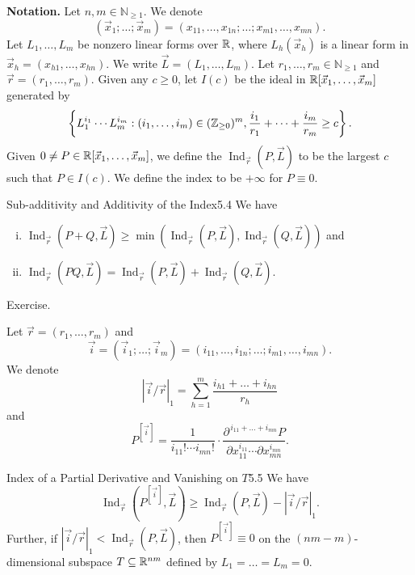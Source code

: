 \documentclass{Vorlesungstemplate_English} %
\renewcommand{\N}{\mathbb{N}_{\geq 1}}
\begin{document}
\fi
\color{orange} \renewcommand{\pfcolor}{orange}
\noindent\textbf{Notation.} Let $n, m \in \N$. We denote
\[ (\vec x_1; \dots; \vec x_m) = (x_{11}, \dots, x_{1n}; \dots; x_{m1}, \dots, x_{mn}).\]
Let $L_1, \dots, L_m$ be nonzero linear forms over $\mathbb{R}$, where $L_h(\vec x_h)$ is a linear form in $\vec x_h = (x_{h1}, \dots, x_{hn})$. We write $\vec L = (L_1, \dots, L_m)$. Let $r_1, \dots, r_m \in \N$ and $\vec r = (r_1, \dots, r_m)$. Given any $c \geq 0$, let $I(c)$ be the ideal in $\mathbb{R}[\vec x_1, \dots, \vec x_m]$ generated by
\[ \left\{ L_1^{i_1}\cdots L_m^{i_m}: (i_1, \dots, i_m) \in (\mathbb{Z}_{\geq 0})^m, \frac{i_1}{r_1} + \dots + \frac{i_m}{r_m} \geq c\right\}.\]
Given $0 \neq P \in \mathbb{R}[\vec x_1, \dots, \vec x_m]$, we define the  $\operatorname{Ind}_{\vec r}(P, \vec L)$ to be the largest $c$ such that $P \in I(c)$. We define the index to be $+\infty$ for $P \equiv 0$.
\begin{lemma}[coltitle=orange]{\color{orange} Sub-additivity and Additivity of the Index}{5.4}
  \color{orange} We have
  \begin{enumerate}[(i)]
    \item $\operatorname{Ind}_{\vec r}(P + Q, \vec L) \geq \min\left(\operatorname{Ind}_{\vec r}(P, \vec L), \operatorname{Ind}_{\vec r}(Q, \vec L)\right)$ and
    \item $\operatorname{Ind}_{\vec r}(PQ, \vec L) = \operatorname{Ind}_{\vec r}(P, \vec L) + \operatorname{Ind}_{\vec r}(Q, \vec L)$.
  \end{enumerate}
\end{lemma}
\begin{colorpf}
  \color{orange} Exercise.
\end{colorpf}
\noindent Let $\vec r = (r_1, \dots, r_m)$ and
\[ \vec i = (\vec i_1; \dots; \vec i_m) = (i_{11}, \dots, i_{1n}; \dots; i_{m1}, \dots, i_{mn}).\]
We denote
\[ \left| \vec i / \vec r\right|_1 = \sum_{h=1}^m \frac{i_{h1} + \dots + i_{hn}}{r_h}\]
and
\[ P^{[\vec i]} = \frac{1}{i_{11}!\cdots i_{mn}!}\cdot\frac{\partial^{\, i_{11}+\dots+i_{mn}}P}{\partial x_{11}^{i_{11}}\cdots\partial x_{mn}^{i_{mn}}}.\]
\begin{lemma}[coltitle=orange]{\color{orange} Index of a Partial Derivative and Vanishing on $T$}{5.5}
  \color{orange} We have
  \[ \operatorname{Ind}_{\vec r}(P^{[\vec i]}, \vec L) \geq \operatorname{Ind}_{\vec r}(P, \vec L) - \left|\vec i/\vec r\right|_1.\]
  Further, if $\left|\vec i/\vec r\right|_1 < \operatorname{Ind}_{\vec r}(P, \vec L)$, then $P^{[\vec i]} \equiv 0$ on the $(nm-m)$-dimensional subspace $T \subseteq \mathbb{R}^{nm}$ defined by $L_1 = \dots = L_m = 0$.
\end{lemma}
\end{document}

